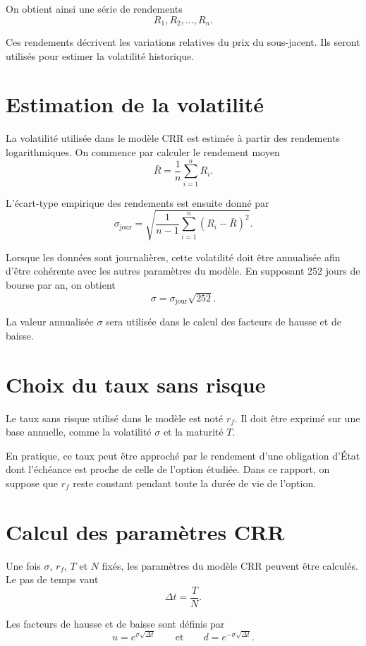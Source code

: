 \documentclass[11pt]{report}
\begin{document}
On obtient ainsi une série de rendements
\[
R_1, R_2, \ldots, R_n.
\]

Ces rendements décrivent les variations relatives du prix du sous-jacent. Ils seront utilisés pour estimer la volatilité historique.

\section{Estimation de la volatilité}

La volatilité utilisée dans le modèle CRR est estimée à partir des rendements logarithmiques. On commence par calculer le rendement moyen
\[
\bar{R} = \frac{1}{n}\sum_{i=1}^{n} R_i.
\]

L'écart-type empirique des rendements est ensuite donné par
\[
\sigma_{\text{jour}} =
\sqrt{
\frac{1}{n-1}
\sum_{i=1}^{n}
(R_i - \bar{R})^2
}.
\]

Lorsque les données sont journalières, cette volatilité doit être annualisée afin d'être cohérente avec les autres paramètres du modèle. En supposant 252 jours de bourse par an, on obtient
\[
\sigma = \sigma_{\text{jour}}\sqrt{252}.
\]

La valeur annualisée $\sigma$ sera utilisée dans le calcul des facteurs de hausse et de baisse.

\section{Choix du taux sans risque}

Le taux sans risque utilisé dans le modèle est noté $r_f$. Il doit être exprimé sur une base annuelle, comme la volatilité $\sigma$ et la maturité $T$.

En pratique, ce taux peut être approché par le rendement d'une obligation d'État dont l'échéance est proche de celle de l'option étudiée. Dans ce rapport, on suppose que $r_f$ reste constant pendant toute la durée de vie de l'option.

\section{Calcul des paramètres CRR}

Une fois $\sigma$, $r_f$, $T$ et $N$ fixés, les paramètres du modèle CRR peuvent être calculés. Le pas de temps vaut
\[
\Delta t = \frac{T}{N}.
\]

Les facteurs de hausse et de baisse sont définis par
\[
u = e^{\sigma\sqrt{\Delta t}}
\qquad \text{et} \qquad
d = e^{-\sigma\sqrt{\Delta t}}.
\]
\end{document}

